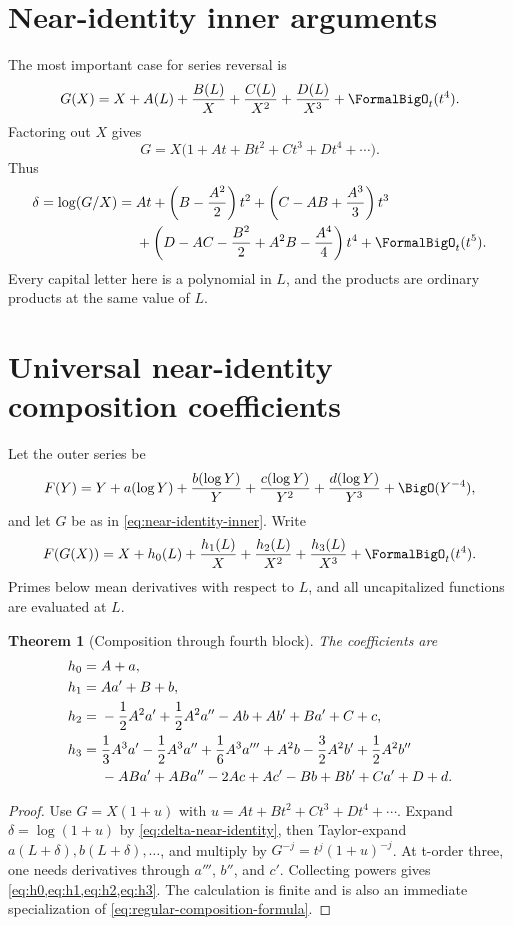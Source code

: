 \documentclass[11pt,openany]{book}
\theoremstyle{definition}
\theoremstyle{plain}
\newtheorem{theorem}{Theorem}[chapter]
\theoremstyle{remark}
\begin{document}
\section{Near-identity inner arguments}
The most important case for series reversal is
\begin{equation}\label{eq:near-identity-inner}
 G(X)=X+A(L)+\frac{B(L)}X+\frac{C(L)}{X^2}
      +\frac{D(L)}{X^3}+\FormalBigO_t(t^4).
\end{equation}
Factoring out \(X\) gives
\[
 G=X\bigl(1+At+Bt^2+Ct^3+Dt^4+\cdots\bigr).
\]
Thus
\begin{equation}\label{eq:delta-near-identity}
\begin{split}
 \delta=\log(G/X)
 ={}&At+\left(B-\frac{A^2}{2}\right)t^2
 +\left(C-AB+\frac{A^3}{3}\right)t^3\\
 &+\left(D-AC-\frac{B^2}{2}+A^2B-\frac{A^4}{4}\right)t^4
 +\FormalBigO_t(t^5).
\end{split}
\end{equation}
Every capital letter here is a polynomial in \(L\), and the products are
ordinary products at the same value of \(L\).

\section{Universal near-identity composition coefficients}
Let the outer series be
\begin{equation}\label{eq:outer-near-identity}
 F(Y)=Y+a(\log Y)+\frac{b(\log Y)}Y
 +\frac{c(\log Y)}{Y^2}+\frac{d(\log Y)}{Y^3}
 +\BigO(Y^{-4}),
\end{equation}
and let \(G\) be as in \cref{eq:near-identity-inner}.  Write
\[
 F(G(X))=X+h_0(L)+\frac{h_1(L)}X+\frac{h_2(L)}{X^2}
 +\frac{h_3(L)}{X^3}+\FormalBigO_t(t^4).
\]
Primes below mean derivatives with respect to \(L\), and all uncapitalized
functions are evaluated at \(L\).

\begin{theorem}[Composition through fourth block]\label{thm:near-composition-coeffs}
The coefficients are
\begin{align}
 h_0={}&A+a,\label{eq:h0}\\
 h_1={}&Aa'+B+b,\label{eq:h1}\\
 h_2={}&-\frac12A^2a'+\frac12A^2a''-Ab+Ab'
       +Ba'+C+c,\label{eq:h2}\\
 h_3={}&\frac13A^3a'-\frac12A^3a''+\frac16A^3a'''
       +A^2b-\frac32A^2b'+\frac12A^2b''\notag\\
 &{}-ABa'+ABa''-2Ac+Ac'-Bb+Bb'+Ca'+D+d.
 \label{eq:h3}
\end{align}
\end{theorem}
\begin{proof}
Use \(G=X(1+u)\) with
\(u=At+Bt^2+Ct^3+Dt^4+\cdots\).  Expand
\(\delta=\log(1+u)\) by \cref{eq:delta-near-identity}, then Taylor-expand
\(a(L+\delta),b(L+\delta),\ldots\), and multiply by
\(G^{-j}=t^j(1+u)^{-j}\).  At t-order three, one needs derivatives through
\(a'''\), \(b''\), and \(c'\).  Collecting powers gives
\cref{eq:h0,eq:h1,eq:h2,eq:h3}.  The calculation is finite and is also an
immediate specialization of \cref{eq:regular-composition-formula}.
\end{proof}
\end{document}
